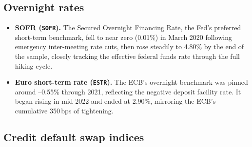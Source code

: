 \subsection*{Overnight rates}

\begin{itemize}
  \item \textbf{SOFR (\texttt{SOFR}).}
    The Secured Overnight Financing Rate, the Fed's preferred short-term
    benchmark, fell to near zero (0.01\%) in March 2020 following emergency
    inter-meeting rate cuts, then rose steadily to 4.80\% by the end of the
    sample, closely tracking the effective federal funds rate through the full
    hiking cycle.

  \item \textbf{Euro short-term rate (\texttt{ESTR}).}
    The ECB's overnight benchmark was pinned around --0.55\% through 2021,
    reflecting the negative deposit facility rate. It began rising in mid-2022
    and ended at 2.90\%, mirroring the ECB's cumulative 350\,bps of
    tightening.
\end{itemize}

\subsection*{Credit default swap indices}

